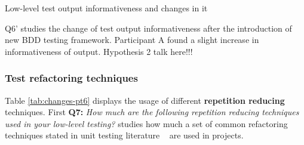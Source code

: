     \begin{table}[H]
            \caption {Low-level test output informativeness and changes in it} \label{tab:changes-pt5}
    \end{table}

Q6' studies the change of test output informativeness after the introduction of new BDD testing framework. Participant A
found a slight increase in informativeness of output. Hypothesis 2 talk here!!!

\clearpage
\subsubsection{Test refactoring techniques}

Table \ref{tab:changes-pt6} displays the usage of different \textbf{repetition reducing} techniques. First \textbf{Q7:}
\textit{How much are the following repetition reducing techniques used in your low-level testing?} studies how much a
set of common refactoring techniques stated in unit testing literature ~\cite{artofunit2013} are used in projects.

